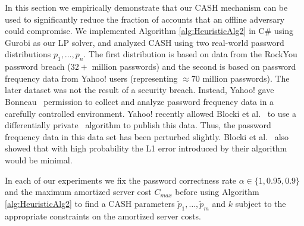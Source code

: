 In this section we empirically demonstrate that our CASH mechanism can be used to significantly reduce the fraction of accounts that an offline adversary could compromise. We implemented Algorithm \ref{alg:HeuristicAlg2} in C\# using Gurobi as our LP solver, and analyzed CASH using two real-world password distributions $p_1,\ldots,p_n$. The first distribution is based on data from the RockYou password breach ($32+$ million passwords) and the second is based on password frequency data from Yahoo! users (representing $\approx 70$ million passwords). The later dataset was not the result of a security breach. Instead, Yahoo! gave Bonneau~\cite{bonneau2012science} permission to collect and analyze password frequency data in a carefully controlled environment. Yahoo! recently allowed Blocki et al.~\cite{blocki2016differentially} to use a differentially private~\cite{dwork2006calibrating} algorithm to publish this data. Thus, the password frequency data in this data set has been perturbed slightly.  Blocki et al.~\cite{blocki2016differentially} also showed that with high probability the L1 error introduced by their algorithm would be minimal. 


In each of our experiments we fix the password correctness rate $\alpha \in \{1,0.95,0.9\}$ and the maximum amortized server cost $C_{max}$ before using Algorithm \ref{alg:HeuristicAlg2} to find a CASH parameters $\tilde{p}_1,\ldots, \tilde{p}_m$ and $k$ subject to the appropriate constraints on the amortized server costs. 

